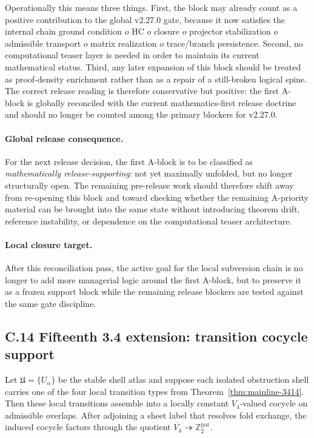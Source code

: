 Operationally this means three things. First, the block may already count as a positive contribution to the global v2.27.0 gate, because it now satisfies the internal chain ground condition $	o$ HC $	o$ closure $	o$ projector stabilization $	o$ admissible transport $	o$ matrix realization $	o$ trace/branch persistence. Second, no computational teaser layer is needed in order to maintain its current mathematical status. Third, any later expansion of this block should be treated as proof-density enrichment rather than as a repair of a still-broken logical spine. The correct release reading is therefore conservative but positive: the first A-block is globally reconciled with the current mathematics-first release doctrine and should no longer be counted among the primary blockers for v2.27.0.

\paragraph{Global release consequence.}
For the next release decision, the first A-block is to be classified as \emph{mathematically release-supporting}: not yet maximally unfolded, but no longer structurally open. The remaining pre-release work should therefore shift away from re-opening this block and toward checking whether the remaining A-priority material can be brought into the same state without introducing theorem drift, reference instability, or dependence on the computational teaser architecture.

\paragraph{Local closure target.}
After this reconciliation pass, the active goal for the local subversion chain is no longer to add more managerial logic around the first A-block, but to preserve it as a frozen support block while the remaining release blockers are tested against the same gate discipline.



\subsection*{C.14 Fifteenth 3.4 extension: transition cocycle support}

\begin{theorem}
\label{thm:appendix-3415}
Let $\mathfrak U=\{U_\alpha\}$ be the stable shell atlas and suppose each isolated obstruction shell carries one of the four local transition types from Theorem~\ref{thm:mainline-3414}. Then these local transitions assemble into a locally constant $V_4$-valued cocycle on admissible overlaps. After adjoining a sheet label that resolves fold exchange, the induced cocycle factors through the quotient $V_4\twoheadrightarrow \mathbb Z_2^{\mathrm{par}}$.
\end{theorem}

